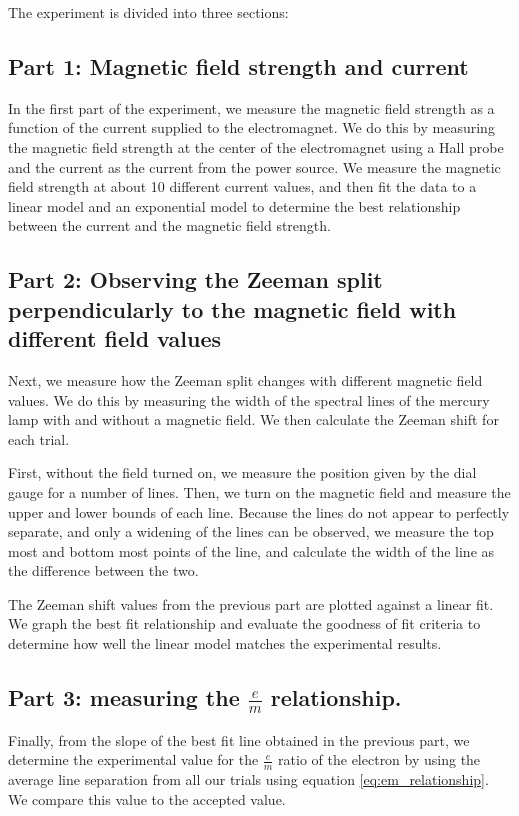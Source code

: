 The experiment is divided into three sections:

\subsection{Part 1: Magnetic field strength and current}
In the first part of the experiment, we measure the magnetic field strength as a function of the current supplied to the electromagnet. We do this by measuring the magnetic field strength at the center of the electromagnet using a Hall probe and the current as the current from the power source. We measure the magnetic field strength at about 10 different current values, and then fit the data to a linear model and an exponential model to determine the best relationship between the current and the magnetic field strength.

\subsection{Part 2: Observing the Zeeman split perpendicularly to the magnetic field with different field values}

Next, we measure how the Zeeman split changes with different magnetic field values.
We do this by measuring the width of the spectral lines of the mercury lamp with and without a magnetic field.
We then calculate the Zeeman shift for each trial.

First, without the field turned on, we measure the position given by the dial gauge for a number of lines.
Then, we turn on the magnetic field and measure the upper and lower bounds of each line. Because
the lines do not appear to perfectly separate, and only a widening of the lines can be observed,
we measure the top most and bottom most points of the line, and calculate the width of the line as the difference between the two.


The Zeeman shift values from the previous part are plotted against a linear fit. We graph the best fit relationship and
evaluate the goodness of fit criteria to determine how well the linear model matches the experimental results.


\subsection{Part 3: measuring the $\frac{e}{m}$ relationship.}

Finally, from the slope of the best fit line obtained in the previous part, we determine the
experimental value for the $\frac{e}{m}$ ratio of the electron by using the average line separation from all our trials using equation \ref{eq:em_relationship}. We compare this value to the accepted value.

